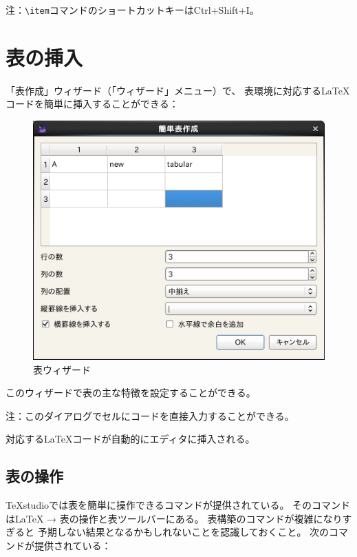 注：\verb+\item+コマンドのショートカットキーはCtrl+Shift+I。

\section{表の挿入}

「表作成」ウィザード（「ウィザード」メニュー）で、
表環境に対応するLaTeXコードを簡単に挿入することができる：

\begin{figure}[htbp]
  \centering
  \includegraphics{doc7.png}
  \caption{表ウィザード}
\end{figure}

このウィザードで表の主な特徴を設定することができる。

注：このダイアログでセルにコードを直接入力することができる。

対応するLaTeXコードが自動的にエディタに挿入される。

\subsection{表の操作}

TeXstudioでは表を簡単に操作できるコマンドが提供されている。
そのコマンドはLaTeX → 表の操作と表ツールバーにある。
表構築のコマンドが複雑になりすぎると
予期しない結果となるかもしれないことを認識しておくこと。
次のコマンドが提供されている：

